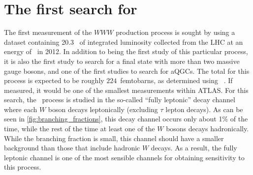\chapter{The first search for \wwwlll}
\label{sec:www}





The first measurement of the $WWW$ production process
is sought by using a dataset containing 20.3 \ifb~of integrated luminosity
collected from the LHC at an energy of \energy~in 2012.
In addition to being the first study of this particular process,
it is also the first study to search for a final state with more 
than two massive gauge bosons, and one of the first studies
to search for aQGCs.
The total \xsec for this process is expected
to be roughly $224$~femtobarns, as determined using 
\madgraph~\cite{MadGraph}. If measured, it 
would be one of the smallest \xsec measurements
within ATLAS. %
For this search, the \www~process is studied in the 
so-called ``fully leptonic'' decay channel
where each $W$ boson decays leptonically (excluding $\tau$ lepton decays).
As can be seen in \fig\ref{fig:branching_fractions},
this decay channel occurs only about 1\% of the time,
while the rest of the time
at least one of the $W$ bosons decays hadronically.
While the branching fraction is small,
this channel should have a smaller background than those 
that include hadronic $W$ decays.
As a result, the fully leptonic channel
is one of the most sensible channels
for obtaining sensitivity to this process.


